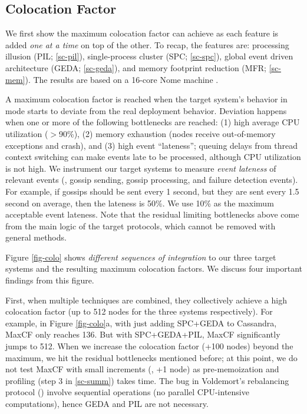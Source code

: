 

\subsection{Colocation Factor}
\label{eval-colo}




We first show the maximum colocation factor \sck can achieve as each
feature is added {\em one at a time} on top of the other.  To recap, the
features are: processing illusion (PIL; \sec\ref{sc-pil}),
single-process cluster (SPC; \sec\ref{sc-spc}), global event driven
architecture (GEDA; \sec\ref{sc-geda}), and memory footprint reduction
(MFR; \sec\ref{sc-mem}).  The results are based on a 16-core Nome 
machine \cite{NomeNodes}.


 A maximum colocation factor
is reached when the target system's behavior in \sck mode starts to
deviate from the real deployment behavior.
%
Deviation happens when one or more of the following bottlenecks are
reached:
%
(1) high average CPU utilization ($>$90\%),
%
(2) memory exhaustion (nodes receive out-of-memory exceptions and crash), and
%
(3) high event ``lateness''; 
queuing delays from thread context switching can make events late to be 
processed,
although CPU utilization is not high.
%
We instrument our target systems to measure {\em event lateness} of
relevant events (\eg, gossip sending, gossip processing, and failure
detection events).  For example, if gossips should be sent every 1 second,
but they are sent every 1.5 second on average, then the lateness is 50\%.
%
We use 10\% as the maximum acceptable event lateness.
%
Note that the residual limiting bottlenecks above come from the main logic
of the target protocols, which cannot be removed with general methods.


 Figure \ref{fig-colo} shows {\em
  different sequences of integration} to our three target systems and the
resulting maximum colocation factors.  We discuss four important findings
from this figure.

First, when multiple techniques are combined, they collectively achieve a
high colocation factor (up to 512 nodes for the three
systems respectively).
%
For example, in Figure \ref{fig-colo}a, with just adding SPC+GEDA to
Cassandra, MaxCF only reaches 136.  But with SPC+GEDA+PIL, MaxCF
significantly jumps to 512.
%
When we increase the colocation factor (+100 nodes) beyond the maximum, we
hit the residual bottlenecks mentioned before; at this point, we do not test MaxCF
with small increments (\eg, +1 node) as pre-memoization 
and profiling (step 3 in
\sec\ref{sc-summ}) takes time.
%
The bug in Voldemort's rebalancing protocol (\voldone) involve sequential
operations (no parallel CPU-intensive computations), hence GEDA and PIL
are not necessary.  



